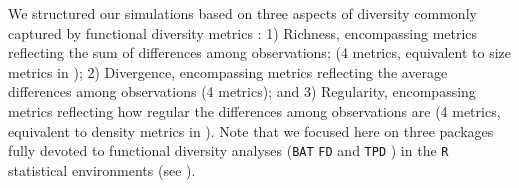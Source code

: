 \documentclass[12pt,letterpaper]{article}
\begin{document}
We structured our simulations based on three aspects of diversity commonly captured by functional diversity metrics \citep{mammola2021concepts}:
1) Richness, encompassing metrics reflecting the sum of differences among observations; (4 metrics, equivalent to size metrics in \citealt{guillerme2020shifting});
2) Divergence, encompassing metrics reflecting the average differences among observations (4 metrics); and
3) Regularity, encompassing metrics reflecting how regular the differences among observations are (4 metrics, equivalent to density metrics in \citealt{guillerme2020shifting}).
Note that we focused here on three packages fully devoted to functional diversity analyses (\texttt{BAT} \citealt{cardoso2015bat} \texttt{FD} \citealt{Laliberte2010FD} and \texttt{TPD} \citealt{carmona2019trait}) in the \texttt{R} statistical environments (see \citealt{mammola2021concepts}).
\end{document}
